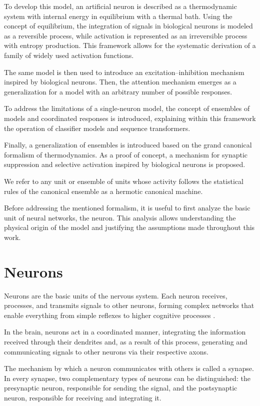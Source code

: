 \documentclass[12pt]{article}
\begin{document}
To develop this model, an artificial neuron is described as a thermodynamic system with internal energy in equilibrium with a thermal bath. Using the concept of equilibrium, the integration of signals in biological neurons \cite{dayan2001theoretical}  is modeled as a reversible process, while activation is represented as an irreversible  process with entropy production. This framework allows for the systematic derivation of a family of widely used activation functions.
 
The same model is then used to introduce an excitation–inhibition mechanism inspired by biological neurons. Then, the attention mechanism emerges as a generalization for a model with an arbitrary number of possible responses.

To address the limitations of a single-neuron model, the concept of ensembles of models and coordinated responses is introduced, explaining within this framework the operation of classifier models and sequence transformers.

Finally, a generalization of ensembles is introduced based on the grand canonical formalism of thermodynamics. As a proof of concept, a mechanism for synaptic suppression and selective activation inspired by biological neurons is proposed.

We refer to any unit or ensemble of units whose activity follows the statistical rules of the canonical ensemble as a hermotic canonical machine.

Before addressing the mentioned formalism, it is useful to first analyze the basic unit of neural networks, the neuron. This analysis allows understanding the physical origin of the model and justifying the assumptions made throughout this work.
\section*{Neurons}

Neurons are the basic units of the nervous system. Each neuron receives, processes, and transmits signals to other neurons, forming complex networks that enable everything from simple reflexes to higher cognitive processes \cite{dayan2001theoretical}.

In the brain, neurons act in a coordinated manner, integrating the information received through their dendrites and, as a result of this process, generating and communicating signals to other neurons via their respective axons.

The mechanism by which a neuron communicates with others is called a synapse. In every synapse, two complementary types of neurons can be distinguished: the presynaptic neuron, responsible for sending the signal, and the postsynaptic neuron, responsible for receiving and integrating it.
\end{document}
